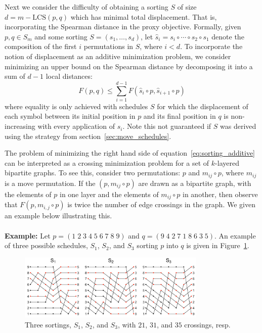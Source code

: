 \documentclass{article} %
\begin{document}
Next we consider the difficulty of obtaining a sorting $S$ of size $d = m - \mathrm{LCS}(p,q)$ which has minimal total displacement. 
That is, incorporating the Spearman distance in the proxy objective. 
Formally, given $p, q \in S_m$ and some sorting  $S = (s_1, \dots, s_d)$, let $\hat{s}_i =  s_i \circ \cdots \circ s_2 \circ s_1$ denote the composition of the first $i$ permutations in $S$, where $i < d$. To incorporate the notion of displacement as an additive minimization problem, we consider minimizing an upper bound on the Spearman distance by decomposing it into a sum of $d-1$ local distances:
\begin{equation}\label{eq:sorting_additive}
F(p, q) \leq \sum\limits_{i=1}^{d-1} F(\hat{s}_i \circ p, \hat{s}_{i+1} \circ p)
\end{equation}
where equality is only achieved with schedules $S$ for which the displacement of each symbol between its initial position in $p$ and its final position in $q$ is non-increasing with every application of $s_i$. Note this not guaranteed if $S$ was derived using the strategy from section~\ref{sec:move_schedules}.

The problem of minimizing the right hand side of equation~\ref{eq:sorting_additive} can be interpreted as a crossing minimization problem for a set of $k$-layered bipartite graphs. To see this, consider two permutations: $p$ and $m_{ij} \circ p$, where $m_{ij}$ is a move permutation. If the $(p, m_{ij} \circ p)$ are drawn as a bipartite graph, with the elements of $p$ in one layer and the elements of $m_{ij} \circ p$ in another, then observe that $F(p, m_{i,j} \circ p)$ is twice the number of edge crossings in the graph. We given an example below illustrating this. 
\\
\\
\noindent \textbf{Example:} 
Let  $p= (1\;2\;3\;4\;5\;6\;7\;8\;9)$ 
and 
$q = (9\;4\;2\;7\;1\;8\;6\;3\;5)$.
An example of three possible schedules, $S_1$, $S_2$, and $S_3$ sorting $p$ into $q$ is given in Figure~\ref{fig:crossings}. 
\begin{figure}[!htb]
    \centering
    \includegraphics[width=0.80\textwidth]{crossings.png}
    \caption{Three sortings, $S_1$, $S_2$, and $S_3$, with $21$, $31$, and $35$ crossings, resp.}
    \label{fig:crossings}
\end{figure}
\end{document}
